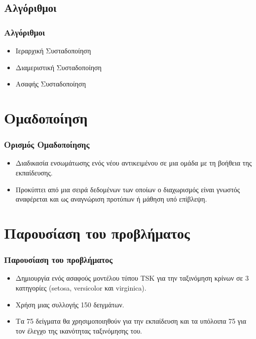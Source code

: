 \documentclass[xetex,serif,mathserif,14pt]{beamer}
\begin{document}
\subsection{Αλγόριθμοι}

\begin{frame}
\frametitle{Αλγόριθμοι}
\begin{itemize}
  \item Ιεραρχική Συσταδοποίηση\pause
  \item Διαμεριστική Συσταδοποίηση\pause
  \item Ασαφής Συσταδοποίηση
\end{itemize}
\end{frame}


\section{Ομαδοποίηση}

\begin{frame}
\frametitle{Ορισμός Ομαδοποίησης}
\begin{itemize}
  \item Διαδικασία ενσωμάτωσης ενός νέου αντικειμένου σε μια ομάδα με τη βοήθεια της εκπαίδευσης.\pause
  \item Προκύπτει από μια σειρά δεδομένων των οποίων ο διαχωρισμός είναι γνωστός αναφέρεται και ως αναγνώριση  προτύπων ή μάθηση υπό επίβλεψη.
\end{itemize}
\end{frame}


\section{Παρουσίαση του προβλήματος}

\begin{frame}
\frametitle{Παρουσίαση του προβλήματος}
\begin{itemize}
  \item Δημιουργία ενός ασαφούς μοντέλου τύπου TSK για την ταξινόμηση κρίνων σε 3 κατηγορίες (setosa, versicolor και virginica).\pause
  \item Χρήση μιας συλλογής 150 δειγμάτων.\pause
  \item Τα 75 δείγματα θα χρησιμοποιηθούν για την εκπαίδευση και τα υπόλοιπα 75 για τον έλεγχο της ικανότητας ταξινόμησης του.
\end{itemize}
\end{frame}
\end{document}

